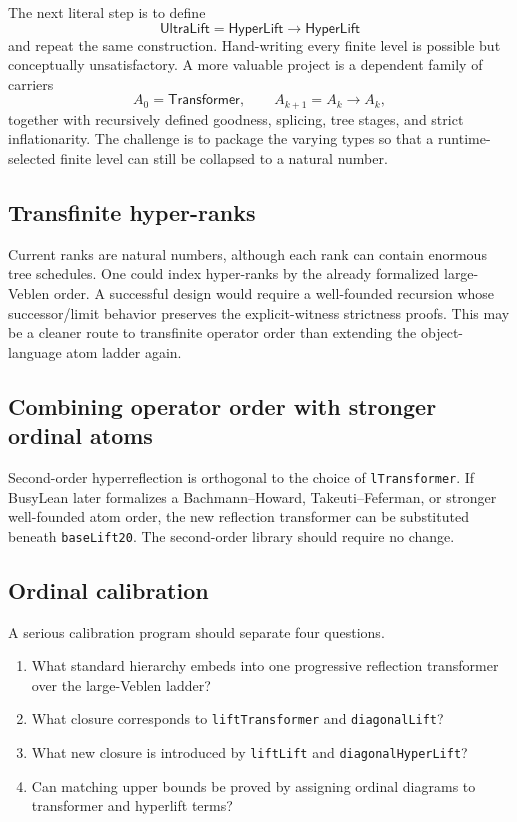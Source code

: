 \documentclass[11pt]{article}
\theoremstyle{definition}
\theoremstyle{remark}
\newcommand{\lean}[1]{\nolinkurl{#1}}
\newcommand{\Tr}{\mathsf{Transformer}}
\newcommand{\HL}{\mathsf{HyperLift}}
\begin{document}
The next literal step is to define
\[
  \mathsf{UltraLift}=\HL\to\HL
\]
and repeat the same construction. Hand-writing every finite level is possible
but conceptually unsatisfactory. A more valuable project is a dependent family
of carriers
\[
  A_0=\Tr,\qquad A_{k+1}=A_k\to A_k,
\]
together with recursively defined goodness, splicing, tree stages, and strict
inflationarity. The challenge is to package the varying types so that a
runtime-selected finite level can still be collapsed to a natural number.

\subsection{Transfinite hyper-ranks}

Current ranks are natural numbers, although each rank can contain enormous
tree schedules. One could index hyper-ranks by the already formalized
large-Veblen order. A successful design would require a well-founded recursion
whose successor/limit behavior preserves the explicit-witness strictness
proofs. This may be a cleaner route to transfinite operator order than extending
the object-language atom ladder again.

\subsection{Combining operator order with stronger ordinal atoms}

Second-order hyperreflection is orthogonal to the choice of
\lean{lTransformer}. If BusyLean later formalizes a Bachmann--Howard,
Takeuti--Feferman, or stronger well-founded atom order, the new reflection
transformer can be substituted beneath \lean{baseLift20}. The second-order
library should require no change.

\subsection{Ordinal calibration}

A serious calibration program should separate four questions.

\begin{enumerate}[leftmargin=*]
\item What standard hierarchy embeds into one progressive reflection
  transformer over the large-Veblen ladder?
\item What closure corresponds to \lean{liftTransformer} and
  \lean{diagonalLift}?
\item What new closure is introduced by \lean{liftLift} and
  \lean{diagonalHyperLift}?
\item Can matching upper bounds be proved by assigning ordinal diagrams to
  transformer and hyperlift terms?
\end{enumerate}
\end{document}
